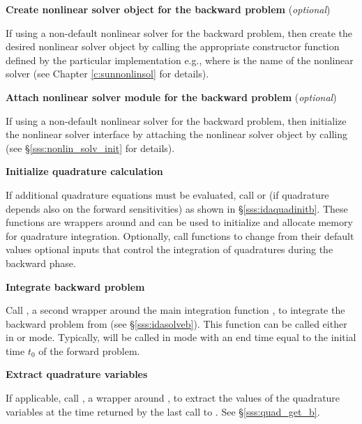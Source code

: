 \begin{Steps}
\item
  {\bf Create nonlinear solver object for the backward problem} (\textit{optional})

  If using a non-default nonlinear solver for the backward problem, then create
  the desired nonlinear solver object by calling the appropriate constructor
  function defined by the particular {\sunnonlinsol} implementation e.g.,
   where \id{***} is the name of the
  nonlinear solver (see Chapter \ref{c:sunnonlinsol} for details).

\item
  {\bf Attach nonlinear solver module for the backward problem} (\textit{optional})

  If using a non-default nonlinear solver for the backward problem, then
  initialize the nonlinear solver interface by attaching the nonlinear solver
  object by calling \\ \noindent
  (see \S\ref{sss:nonlin_solv_init} for details).

\item \label{i:quadB}
  {\bf Initialize quadrature calculation}

  If additional quadrature equations must be evaluated,
  call  or  (if quadrature depends also on the
  forward sensitivities) as shown in \S\ref{sss:idaquadinitb}. These functions are
  wrappers around  and can be used to initialize and allocate
  memory for quadrature integration. Optionally, call  functions
  to change from their default values optional inputs that control the integration
  of quadratures during the backward phase.

\item
  {\bf Integrate backward problem}

  Call , a second wrapper around the {\idas} main integration
  function , to integrate the backward problem from 
  (see \S\ref{sss:idasolveb}). This function can be called either in 
  or  mode. Typically,  will be called in 
  mode with an end time equal to the initial time $t_0$ of the forward problem.

\item \label{i:back_end}
  {\bf Extract quadrature variables}

  If applicable, call , a wrapper around ,
  to extract the values of the quadrature variables at the time returned
  by the last call to .  See \S\ref{sss:quad_get_b}.


\end{Steps}
